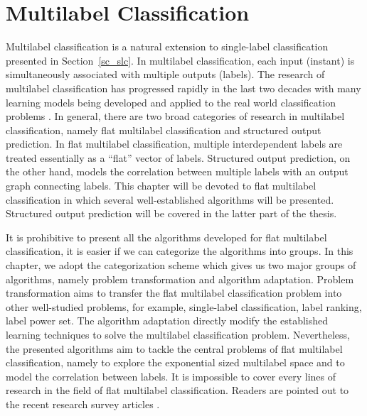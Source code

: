{




%
%
\chapter{Multilabel Classification} \label{ch_fmlc}

Multilabel classification is a natural extension to single-label classification presented in Section~\ref{sc_slc}.
In multilabel classification, each input (instant) is simultaneously associated with multiple outputs (labels).
The research of multilabel classification has progressed rapidly in the last two decades with many learning models being developed and applied to the real world classification problems \citep{lafferty01,taskar02,Taskar04max,THJA04,Rousu07}.
In general, there are two broad categories of research in multilabel classification, namely flat multilabel classification and structured output prediction.
In flat multilabel classification, multiple interdependent labels are treated essentially as a ``flat'' vector of labels.
Structured output prediction, on the other hand, models the correlation between multiple labels with an output graph connecting labels.
This chapter will be devoted to flat multilabel classification in which several well-established algorithms will be presented.
Structured output prediction will be covered in the latter part of the thesis.

It is prohibitive to present all the algorithms developed for flat multilabel classification, it is easier if we can categorize the algorithms into groups.
In this chapter, we adopt the categorization scheme \citep{Tsoumakas07multi,Tsoumakas10mining} which gives us two major groups of algorithms, namely problem transformation and algorithm adaptation.
Problem transformation aims to transfer the flat multilabel classification problem into other well-studied problems, for example, single-label classification, label ranking, label power set.
The algorithm adaptation directly modify the established learning techniques to solve the multilabel classification problem.
Nevertheless, the presented algorithms aim to tackle the central problems of flat multilabel classification, namely to explore the exponential sized multilabel space and to model the correlation between labels.
It is impossible to cover every lines of research in the field of flat multilabel classification.
Readers are pointed out to the recent research survey articles \citep{Tsoumakas07multi,Tsoumakas10mining,Zhang14a}.



}
